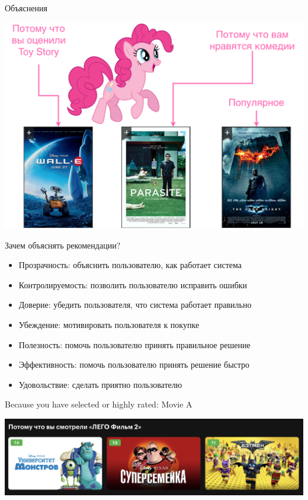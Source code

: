 \documentclass[11pt,aspectratio=169]{beamer}
\begin{document}
\begin{frame}{Объяснения}

\begin{center}
\includegraphics[scale=0.22]{images/explainability-2.png}
\end{center}

\end{frame}

\begin{frame}{Зачем объяснять рекомендации?}
\begin{itemize} \pause
\item Прозрачность: объяснить пользователю, как работает система \pause
\item Контролируемость: позволить пользователю исправить ошибки \pause
\item Доверие: убедить пользователя, что система работает правильно \pause
\item Убеждение: мотивировать пользователя к покупке \pause
\item Полезность: помочь пользователю принять правильное решение \pause
\item Эффективность: помочь пользователю принять решение быстро \pause
\item Удовольствие: сделать приятно пользователю
\end{itemize}
\end{frame}

\begin{frame}

\begin{tcolorbox}[colback=info!5,colframe=info!80,title=Case-based]
Because you have selected or highly rated: Movie A
\end{tcolorbox}

\vfill

\begin{center}
\includegraphics[scale=0.3]{images/netflix.png}
\end{center}

\end{frame}
\end{document}
